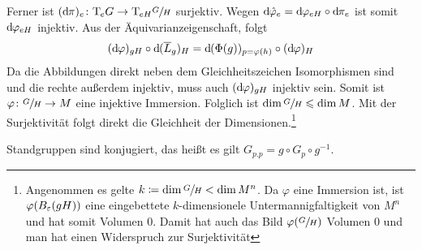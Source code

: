 \begin{beweis}
\begin{itemize}
		Ferner ist $(\mathrm{d}\mkern-1.0mu \pi)_e \colon \mathrm{T}\mkern-0.85mu_e G \to \mathrm{T}\mkern-0.85mu_{eH} \sfrac{G}{H}$ surjektiv.
		Wegen $\mathrm{d}\mkern-1.0mu \hat{\varphi}_e = \mathrm{d}\mkern-1.0mu \varphi_{eH} \circ  \mathrm{d}\mkern-1.0mu \pi_e$ ist somit $\mathrm{d}\mkern-1.0mu \varphi_{eH}$ injektiv.
		Aus der Äquivarianzeigenschaft, folgt 
		\[
			(\mathrm{d}\mkern-1.0mu \varphi)_{gH}\circ \mathrm{d}\mkern-1.0mu(\overline{L}_g)_H = \mathrm{d}\mkern-1.0mu(\Phi(g))_{p=\varphi(h)} \circ (\mathrm{d}\mkern-1.0mu \varphi)_H
		\]
		Da die Abbildungen direkt neben dem Gleichheitszeichen Isomorphismen sind und die rechte außerdem injektiv, muss auch $(\mathrm{d}\mkern-1.0mu \varphi)_{gH}$ injektiv sein.
		Somit ist $\varphi \colon \sfrac{G}{H} \to M$ eine injektive Immersion.
		Folglich ist $\dim \sfrac{G}{H} \leqslant \dim M$.
		Mit der Surjektivität folgt direkt die Gleichheit der Dimensionen.\footnote{Angenommen es gelte $k \coloneqq \dim \sfrac{G}{H} < \dim M^n$. Da $\varphi$ eine Immersion ist, ist $\varphi \enbrace*{B_\varepsilon(gH)}$ eine eingebettete $k$-dimensionele Untermannigfaltigkeit von $M^n$ und hat somit Volumen 0.
		Damit hat auch das Bild $\varphi(\sfrac{G}{H})$ Volumen 0 und man hat einen Widerspruch zur Surjektivität}\qedhere
	\end{itemize}
\end{beweis}

\begin{bemerkung*}
	Standgruppen sind konjugiert, das heißt es gilt $G_{p.p} = g \circ G_p \circ g^{-1}$.
\end{bemerkung*}

